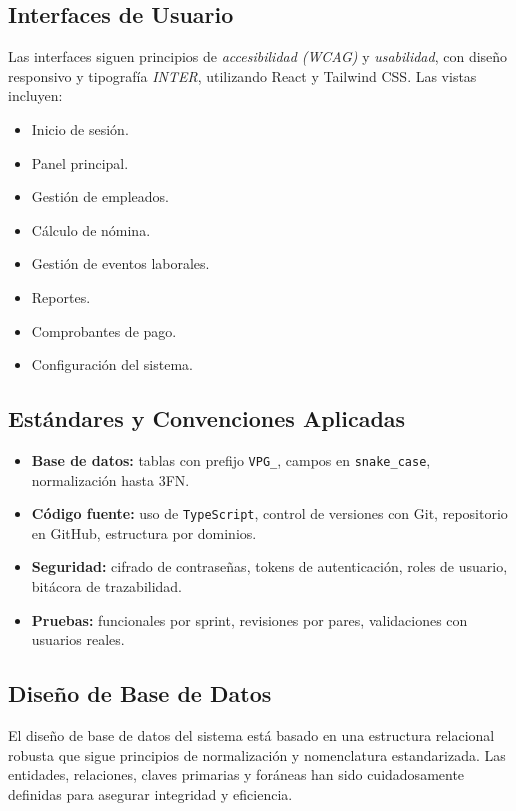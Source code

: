 \subsection{Interfaces de Usuario}

Las interfaces siguen principios de \textit{accesibilidad (WCAG)} y \textit{usabilidad}, con diseño responsivo y tipografía \textit{INTER}, utilizando React y Tailwind CSS. Las vistas incluyen:

\begin{itemize}
	\item Inicio de sesión.
	\item Panel principal.
	\item Gestión de empleados.
	\item Cálculo de nómina.
	\item Gestión de eventos laborales.
	\item Reportes.
	\item Comprobantes de pago.
	\item Configuración del sistema.
\end{itemize}

\subsection{Estándares y Convenciones Aplicadas}

\begin{itemize}
	\item \textbf{Base de datos:} tablas con prefijo \texttt{VPG\_}, campos en \texttt{snake\_case}, normalización hasta 3FN.
	\item \textbf{Código fuente:} uso de \texttt{TypeScript}, control de versiones con Git, repositorio en GitHub, estructura por dominios.
	\item \textbf{Seguridad:} cifrado de contraseñas, tokens de autenticación, roles de usuario, bitácora de trazabilidad.
	\item \textbf{Pruebas:} funcionales por sprint, revisiones por pares, validaciones con usuarios reales.
\end{itemize}

\subsection{Diseño de Base de Datos}

El diseño de base de datos del sistema está basado en una estructura relacional robusta que sigue principios de normalización y nomenclatura estandarizada. Las entidades, relaciones, claves primarias y foráneas han sido cuidadosamente definidas para asegurar integridad y eficiencia.

